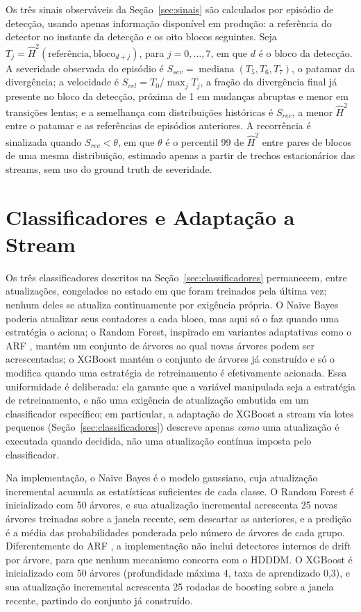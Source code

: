 Os três sinais observáveis da Seção~\ref{sec:sinais} são calculados por
episódio de detecção, usando apenas informação disponível em produção: a
referência do detector no instante da detecção e os oito blocos seguintes.
Seja $T_j = \hat{H}^2(\text{referência}, \text{bloco}_{d+j})$, para
$j = 0, \dots, 7$, em que $d$ é o bloco da detecção. A severidade observada
do episódio é $S_{sev} = \operatorname{mediana}(T_5, T_6, T_7)$, o patamar da
divergência; a velocidade é $S_{vel} = T_0 / \max_j T_j$, a fração da
divergência final já presente no bloco da detecção, próxima de 1 em
mudanças abruptas e menor em transições lentas; e a semelhança com
distribuições históricas é $S_{rec}$, a menor $\hat{H}^2$ entre o patamar e
as referências de episódios anteriores. A recorrência é sinalizada quando
$S_{rec} < \theta$, em que $\theta$ é o percentil 99 de $\hat{H}^2$ entre
pares de blocos de uma mesma distribuição, estimado apenas a partir de
trechos estacionários das streams, sem uso do ground truth de severidade.

\section{Classificadores e Adaptação a Stream}
Os três classificadores descritos na Seção~\ref{sec:classificadores}
permanecem, entre atualizações, congelados no estado em que foram
treinados pela última vez; nenhum deles se atualiza continuamente por
exigência própria. O Naive Bayes poderia atualizar seus contadores a cada
bloco, mas aqui só o faz quando uma estratégia o aciona; o Random Forest, inspirado em variantes adaptativas como o ARF
\cite{gomes2017arf}, mantém um conjunto de árvores ao qual novas árvores
podem ser acrescentadas; o
XGBoost mantém o conjunto de árvores já construído e só o modifica quando
uma estratégia de retreinamento é efetivamente acionada. Essa uniformidade é
deliberada: ela garante que a variável manipulada seja a estratégia de
retreinamento, e não uma exigência de atualização embutida em um classificador
específico; em particular, a adaptação de XGBoost a stream via lotes
pequenos (Seção~\ref{sec:classificadores}) descreve apenas
\emph{como} uma atualização é executada quando decidida, não uma atualização
contínua imposta pelo classificador.

Na implementação, o Naive Bayes é o modelo gaussiano, cuja atualização
incremental acumula as estatísticas suficientes de cada classe. O Random
Forest é inicializado com 50 árvores, e sua atualização incremental acrescenta
25 novas árvores treinadas sobre a janela recente, sem descartar as
anteriores, e a predição é a média das probabilidades ponderada pelo número
de árvores de cada grupo. Diferentemente do ARF
\cite{gomes2017arf}, a implementação não inclui detectores internos de
drift por árvore, para que nenhum mecanismo concorra com o HDDDM. O XGBoost é inicializado com 50 árvores
(profundidade máxima 4, taxa de aprendizado 0,3), e sua atualização
incremental acrescenta 25 rodadas de boosting sobre a janela recente,
partindo do conjunto já construído.


